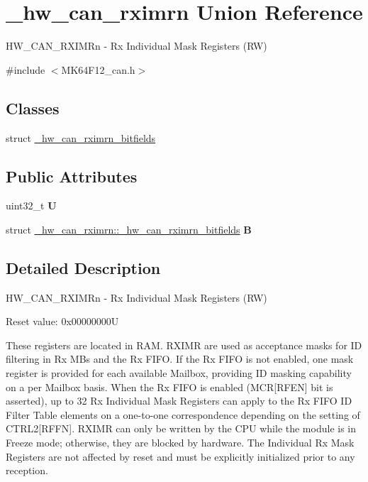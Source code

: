 \hypertarget{union__hw__can__rximrn}{}\section{\+\_\+hw\+\_\+can\+\_\+rximrn Union Reference}
\label{union__hw__can__rximrn}


H\+W\+\_\+\+C\+A\+N\+\_\+\+R\+X\+I\+M\+Rn -\/ Rx Individual Mask Registers (RW)  




{\ttfamily \#include $<$M\+K64\+F12\+\_\+can.\+h$>$}

\subsection*{Classes}
\begin{DoxyCompactItemize}
\item 
struct \hyperlink{struct__hw__can__rximrn_1_1__hw__can__rximrn__bitfields}{\+\_\+hw\+\_\+can\+\_\+rximrn\+\_\+bitfields}
\end{DoxyCompactItemize}
\subsection*{Public Attributes}
\begin{DoxyCompactItemize}
\item 
uint32\+\_\+t {\bfseries U}\hypertarget{union__hw__can__rximrn_a31eddfea5c1d4da583f5ee1b016b2361}{}\label{union__hw__can__rximrn_a31eddfea5c1d4da583f5ee1b016b2361}

\item 
struct \hyperlink{struct__hw__can__rximrn_1_1__hw__can__rximrn__bitfields}{\+\_\+hw\+\_\+can\+\_\+rximrn\+::\+\_\+hw\+\_\+can\+\_\+rximrn\+\_\+bitfields} {\bfseries B}\hypertarget{union__hw__can__rximrn_a8bcdd53cd84323bf4b8232df135b3198}{}\label{union__hw__can__rximrn_a8bcdd53cd84323bf4b8232df135b3198}

\end{DoxyCompactItemize}


\subsection{Detailed Description}
H\+W\+\_\+\+C\+A\+N\+\_\+\+R\+X\+I\+M\+Rn -\/ Rx Individual Mask Registers (RW) 

Reset value\+: 0x00000000U

These registers are located in R\+AM. R\+X\+I\+MR are used as acceptance masks for ID filtering in Rx M\+Bs and the Rx F\+I\+FO. If the Rx F\+I\+FO is not enabled, one mask register is provided for each available Mailbox, providing ID masking capability on a per Mailbox basis. When the Rx F\+I\+FO is enabled (M\+CR\mbox{[}R\+F\+EN\mbox{]} bit is asserted), up to 32 Rx Individual Mask Registers can apply to the Rx F\+I\+FO ID Filter Table elements on a one-\/to-\/one correspondence depending on the setting of C\+T\+R\+L2\mbox{[}R\+F\+FN\mbox{]}. R\+X\+I\+MR can only be written by the C\+PU while the module is in Freeze mode; otherwise, they are blocked by hardware. The Individual Rx Mask Registers are not affected by reset and must be explicitly initialized prior to any reception. 

